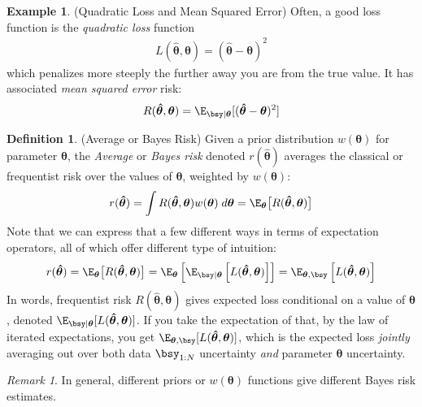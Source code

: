 \documentclass[12pt]{article}
\theoremstyle{plain}
\theoremstyle{definition}
\newtheorem{defn}[thm]{Definition}
\newtheorem{ex}[thm]{Example}
\theoremstyle{remark}
\newtheorem*{rmk}{Remark}
\newcommand{\bstheta}{\boldsymbol{\theta}}
\newcommand{\bshattheta}{\boldsymbol{\hat{\theta}}}
\begin{document}
\begin{ex}(Quadratic Loss and Mean Squared Error)
Often, a good loss function is the \emph{quadratic loss} function
\begin{align*}
  L(\bshattheta,\bstheta) = (\bshattheta-\bstheta)^2
\end{align*}
which penalizes more steeply the further away you are from the true
value. It has associated \emph{mean squared error} risk:
\begin{align*}
  R(\bshattheta,\bstheta) = \E_{\bsy|\bstheta}[(\bshattheta-\bstheta)^2]
\end{align*}
\end{ex}

\clearpage
\begin{defn}(Average or Bayes Risk)
\label{defn:bayesrisk}
Given a prior distribution $w(\bstheta)$ for parameter $\bstheta$, the
\emph{Average} or \emph{Bayes risk} denoted $r(\bshattheta)$ averages
the classical or frequentist risk over the values of $\bstheta$, weighted
by $w(\bstheta)$:
\begin{align*}
  r(\bshattheta)
  = \int R(\bshattheta,\bstheta) w(\bstheta) \; d\bstheta
  = \E_{\bstheta}\big[ R(\bshattheta,\bstheta)\big]
\end{align*}
Note that we can express that a few different ways in terms of
expectation operators, all of which offer different type of intuition:
\begin{align*}
  r(\bshattheta)
  = \E_{\bstheta}\big[ R(\bshattheta,\bstheta)\big]
  = \E_{\bstheta}\left[
      \E_{\bsy|\bstheta}\left[
      L(\bshattheta,\bstheta)
      \right]
    \right]
  = \E_{\bstheta,\bsy}\left[ L(\bshattheta,\bstheta) \right]
\end{align*}
In words, frequentist risk $R(\bshattheta,\bstheta)$ gives expected loss
conditional on a value of $\bstheta$, denoted
$\E_{\bsy|\bstheta}[L(\bshattheta,\bstheta)]$. If you take the
expectation of that, by the law of iterated expectations, you get
$\E_{\bstheta,\bsy}[L(\bshattheta,\bstheta)]$, which is the expected
loss \emph{jointly} averaging out over both data $\bsy_{1:N}$
uncertainty \emph{and} parameter $\bstheta$ uncertainty.
\end{defn}
\begin{rmk}
In general, different priors or $w(\bstheta)$ functions give
different Bayes risk estimates.
\end{rmk}
\end{document}
